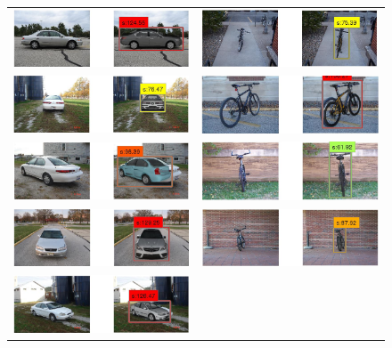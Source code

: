 \documentclass[10pt,twocolumn,letterpaper]{article}
\begin{document}
\begin{figure}[h]
\begin{tabular}{|c|c|}
  \includegraphics[width=0.40\linewidth]{supp/car10.png} &
  \includegraphics[width=0.40\linewidth]{supp/bicycle9.png} \\
  \includegraphics[width=0.40\linewidth]{supp/car13.png} &
  \includegraphics[width=0.40\linewidth]{supp/bicycle13.png} \\
  \includegraphics[width=0.40\linewidth]{supp/car15.png} &
  \includegraphics[width=0.40\linewidth]{supp/bicycle11.png} \\
  \includegraphics[width=0.40\linewidth]{supp/car8.png} &
  \includegraphics[width=0.40\linewidth]{supp/bicycle12.png} \\
  \includegraphics[width=0.40\linewidth]{supp/car20.png} & 

\end{tabular}
\end{figure}
\end{document}
